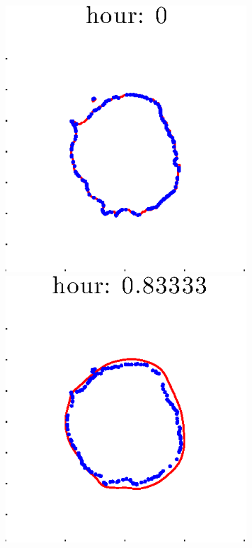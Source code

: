 \documentclass[12pt]{article}
\begin{document}
\begin{figure}[h!]
\begin{subfigure}[b]{.3\textwidth}
	\end{subfigure}
	\begin{subfigure}[b]{.3\textwidth}
	\centering
		\includegraphics[height=.15\textheight]{Pos0/firsthalf/second1.eps}
		\includegraphics[height=.15\textheight]{Pos0/firsthalf/second2.eps}

\end{subfigure}
\end{figure}
\end{document}
